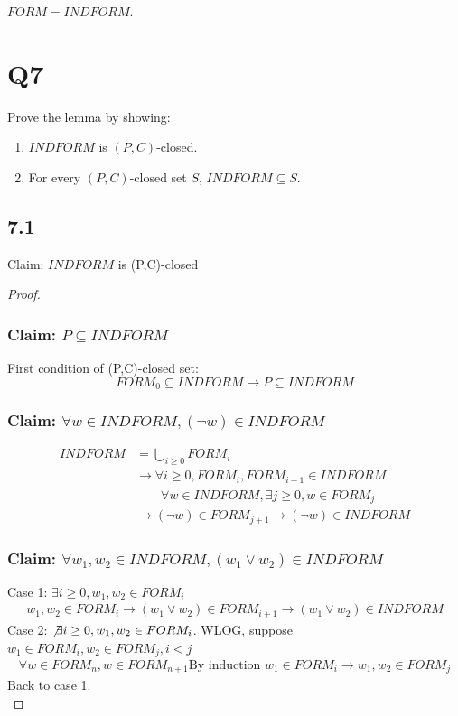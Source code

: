 \documentclass{article}
\newtheorem{lemma}[theorem]{Lemma}
\let\oldlemma\lemma
\let\endoldlemma\endlemma
\renewenvironment{lemma}
  {\begin{tcolorbox}[
      colback=green!8,
      colframe=green!50!black,
      boxrule=0.6pt,
      arc=2pt,
      left=6pt,right=6pt,top=4pt,bottom=4pt
    ]\oldlemma}
  {\endoldlemma\end{tcolorbox}}
\begin{document}
\begin{lemma}
    ${FORM} = {INDFORM}$.
    \end{lemma}
\section*{Q7}    
    Prove the lemma by showing:
    \begin{enumerate}
      \item ${INDFORM}$ is $(P,C)$-closed.
      \item For every $(P,C)$-closed set $S$, ${INDFORM} \subseteq S$.
    \end{enumerate}
\subsection*{7.1}
Claim: $INDFORM$ is (P,C)-closed
\begin{proof}
    \subsubsection*{Claim: $P \subseteq INDFORM$}
    First condition of (P,C)-closed set:
    \[FORM_0 \subseteq INDFORM \rightarrow P \subseteq INDFORM\]
    \subsubsection*{Claim: $\forall w \in INDFORM, (\neg w) \in INDFORM$}
    \begin{align*}
        INDFORM &= \bigcup_{i\geq 0} FORM_i \\
        &\rightarrow \forall i \geq 0, FORM_i, FORM_{i+1} \in INDFORM\\
        &\qquad \forall w \in INDFORM, \exists j \geq 0, w \in FORM_j \\
        &\rightarrow (\neg w) \in FORM_{j+1} \rightarrow (\neg w) \in INDFORM
    \end{align*}
    \subsubsection*{Claim: $\forall w_1, w_2 \in INDFORM, (w_1 \lor w_2) \in INDFORM$}
    Case 1: $\exists i \geq 0, w_1, w_2 \in FORM_i$
    \begin{align*}
        w_1, w_2 \in FORM_i \rightarrow (w_1 \lor w_2) \in FORM_{i+1} \rightarrow (w_1 \lor w_2) \in INDFORM
    \end{align*}
    Case 2: $\not\exists i \geq 0, w_1, w_2 \in FORM_i$.
    WLOG, suppose $w_1 \in FORM_i, w_2 \in FORM_j, i < j$
    \begin{align*}
        \forall w \in FORM_n, w \in FORM_{n+1}
        \text{By induction } w_1 \in FORM_i \rightarrow w_1, w_2 \in FORM_j
    \end{align*}
    Back to case 1.\\
\end{proof}
\end{document}
